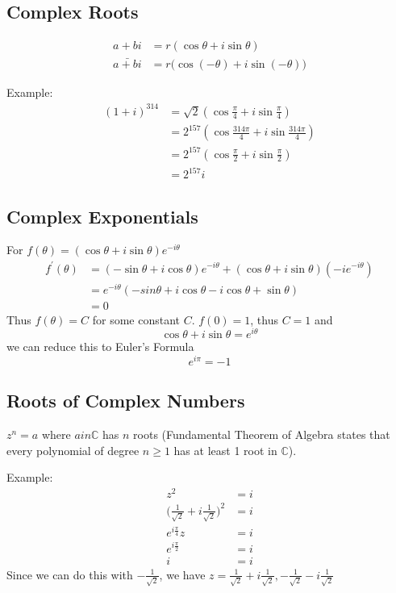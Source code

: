\documentclass[12pt]{article}
\begin{document}
\subsection*{Complex Roots}
\begin{align*}
a + bi &= r(\cos\theta + i\sin\theta)\\
\bar{a+bi} &= r\bigl(\cos(-\theta) + i\sin(-\theta)\bigl)
\end{align*}

Example:
\begin{align*}
(1 + i)^{314} &= \sqrt{2}(\cos\frac{\pi}{4} + i\sin\frac{\pi}{4})\\
&= 2^{157}(\cos\frac{314\pi}{4} + i\sin\frac{314\pi}{4})\\
&= 2^{157}(\cos\frac{\pi}{2} + i\sin\frac{\pi}{2})\\
&= 2^{157}i
\end{align*}

\subsection*{Complex Exponentials}
For $f(\theta) = (\cos\theta + i\sin\theta)e^{-i\theta}$
\begin{align*}
f^\prime(\theta) &= (-\sin\theta + i\cos\theta)e^{-i\theta} + (\cos\theta + i\sin\theta)(-ie^{-i\theta})\\
&= e^{-i\theta}(-sin\theta + i\cos\theta - i\cos\theta + \sin\theta)\\
&= 0
\end{align*}
Thus $f(\theta) = C$ for some constant $C$. $f(0) = 1$, thus $C = 1$ and \[ \cos\theta + i\sin\theta = e^{i\theta} \] we can reduce this to Euler's Formula \[ e^{i\pi} = -1 \]

\subsection*{Roots of Complex Numbers}
$z^n = a$ where $a in \mathbb{C}$ has $n$ roots (Fundamental Theorem of Algebra states that every polynomial of degree $n \geq 1$ has at least 1 root in $\mathbb{C}$).

Example:
\begin{align*}
z^2 &= i\\
\bigg(\frac{1}{\sqrt{2}} + i\frac{1}{\sqrt{2}}\bigg)^2 &= i\\
e^{i\frac{\pi}{4}}z &= i\\
e^{i\frac{\pi}{2}} &= i\\
i &= i
\end{align*}
Since we can do this with $-\frac{1}{\sqrt{2}}$, we have $z = \frac{1}{\sqrt{2}} + i\frac{1}{\sqrt{2}}, -\frac{1}{\sqrt{2}} - i\frac{1}{\sqrt{2}}$
\end{document}
